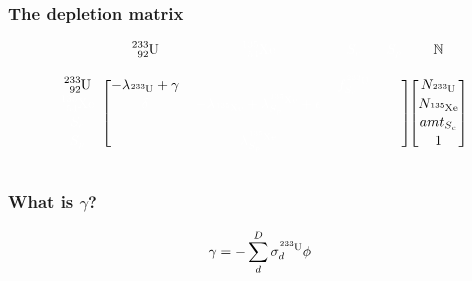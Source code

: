 \documentclass{beamer}
\def\w{\color{white}}
\def\b{\color{black}}
\begin{document}
\begin{frame}
\frametitle{The depletion matrix}
    \begin{equation*}
        \begin{blockarray}{cccccc}
             &
            \b \ce{^{233}_{92}U} &
            \w \ce{^{135}_{54}Xe} &
            \w S_{c} &
            \w S_{p} &
            \mathbb{N} \\
             &
             &
             &
             &
             &
             \\ 
        \begin{block}{c[cccc][c]}
            \b \ce{^{233}_{92}U} &
            \b -\lambda_{\ce{^{233}U}} + \gamma &
             &
            \w f_{S_{c}}^{\ce{^{233}U}} &
             &
            N_{\ce{^{233}U}} \\
            \w \ce{^{135}_{54}Xe} &
            \w \delta &
            \w -\lambda_{\ce{^{135}Xe}} + \lambda_{S_{p}}^{\ce{^{135}Xe}} +
                \epsilon &
             &
             &
            N_{\ce{^{135}Xe}} \\
            \w S_{c} &
             &
             &
             &
             &
            amt_{S_{c}} \\
            \w S_{p} &
             &
            \w \lambda_{S_{p}}^{\ce{^{135}Xe}} &
             &
             &
             1\\
        \end{block}
        \end{blockarray}
    \end{equation*}

\end{frame}

\begin{frame}
\frametitle{What is $\gamma$?}

    \begin{equation}
        \gamma =  - \sum \limits_{d}^{D} \sigma_{d}^{\ce{^{233}U}} \phi
    \end{equation}

\end{frame}
\end{document}

